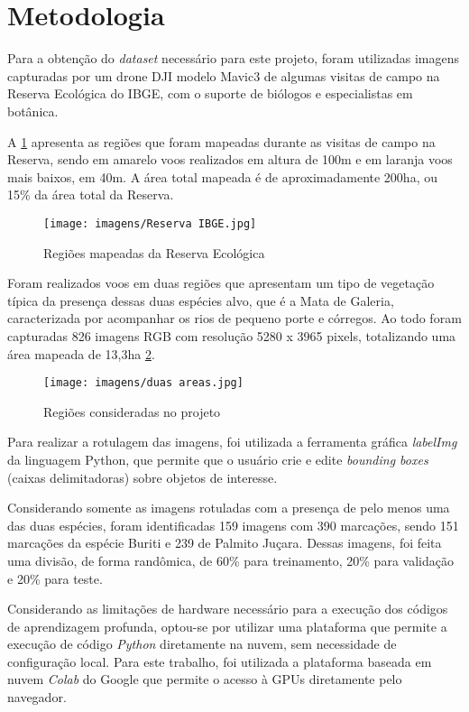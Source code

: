 \section{Metodologia}
\label{sec:formatting}

Para a obtenção do \textit{dataset} necessário para este projeto, foram utilizadas imagens capturadas por um drone DJI modelo Mavic3 de algumas visitas de campo na Reserva Ecológica do IBGE, com o suporte de biólogos e especialistas em botânica.

A \cref{fig:mapa_reserva} apresenta as regiões que foram mapeadas durante as visitas de campo na Reserva, sendo em amarelo voos realizados em altura de 100m e em laranja voos mais baixos, em 40m. A área total mapeada é de aproximadamente 200ha, ou 15\% da área total da Reserva.

\begin{figure}[H]
    \centering
    \texttt{[image: imagens/Reserva IBGE.jpg]}
    \caption{Regiões mapeadas da Reserva Ecológica}
    \label{fig:mapa_reserva}
\end{figure}

Foram realizados voos em duas regiões que apresentam um tipo de vegetação típica da presença dessas duas espécies alvo, que é a Mata de Galeria, caracterizada por acompanhar os rios de pequeno porte e córregos. Ao todo foram capturadas 826 imagens RGB com resolução 5280 x 3965 pixels, totalizando uma área mapeada de 13,3ha \cref{fig:duas_areas}.

\begin{figure}[H]
    \centering
    \texttt{[image: imagens/duas areas.jpg]}
    \caption{Regiões consideradas no projeto}
    \label{fig:duas_areas}
\end{figure}


Para realizar a rotulagem das imagens, foi utilizada a ferramenta gráfica \textit{labelImg} da linguagem Python, que permite que o usuário crie e edite \textit{bounding boxes} (caixas delimitadoras) sobre objetos de interesse. 

Considerando somente as imagens rotuladas com a presença de pelo menos uma das duas espécies, foram identificadas 159 imagens com 390 marcações, sendo 151 marcações da espécie Buriti e 239 de Palmito Juçara. Dessas imagens, foi feita uma divisão, de forma randômica, de 60\% para treinamento, 20\% para validação e 20\% para teste.


Considerando as limitações de hardware necessário para a execução dos códigos de aprendizagem profunda, optou-se por utilizar uma plataforma que permite a execução de código \textit{Python} diretamente na nuvem, sem necessidade de configuração local. Para este trabalho, foi utilizada a plataforma baseada em nuvem \textit{Colab} do Google que permite o acesso à GPUs diretamente pelo navegador.

